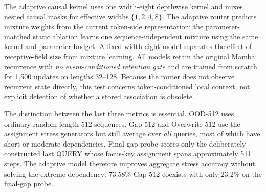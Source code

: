 \documentclass[10pt,a4paper]{article}
\begin{document}
The adaptive causal kernel uses one width-eight depthwise kernel and mixes nested causal masks for effective widths \(\{1,2,4,8\}\). The adaptive router predicts mixture weights from the current token-side representation; the parameter-matched static ablation learns one sequence-independent mixture using the same kernel and parameter budget. A fixed-width-eight model separates the effect of receptive-field size from mixture learning. All models retain the original Mamba recurrence with \emph{no event-conditioned retention gate} and are trained from scratch for 1,500 updates on lengths 32--128. Because the router does not observe recurrent state directly, this test concerns token-conditioned local context, not explicit detection of whether a stored association is obsolete.

\addtocounter{table}{1}%
\begin{table}[!htbp]
\centering\small
\caption{Adaptive-kernel architecture controls and assignment-defined stress results (seed 42, accuracy in \%).}
\end{table}

The distinction between the last three metrics is essential. OOD-512 uses ordinary random length-512 sequences. Gap-512 and Overwrite-512 use the assignment stress generators but still average over \emph{all} queries, most of which have short or moderate dependencies. Final-gap probe scores only the deliberately constructed last QUERY whose focus-key assignment spans approximately 511 steps. The adaptive model therefore improves aggregate stress accuracy without solving the extreme dependency: 73.58\% Gap-512 coexists with only 23.2\% on the final-gap probe.
\end{document}
